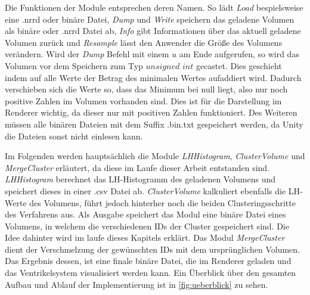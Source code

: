Die Funktionen der Module entsprechen deren Namen. So lädt \textit{Load} bespielsweise eine .nrrd oder binäre Datei, \textit{Dump} und \textit{Write} speichern das geladene Volumen als binäre oder .nrrd Datei ab, \textit{Info} gibt Informationen über das aktuell geladene Volumen zurück und \textit{Resample} lässt den Anwender die Größe des Volumens verändern.
\newline
Wird der \textit{Dump} Befehl mit einem $u$ am Ende aufgerufen, so wird das Volumen vor dem Speichern zum Typ $unsigned$ $int$ gecastet. Dies geschieht indem auf alle Werte der Betrag des minimalen Wertes aufaddiert wird. Dadurch verschieben sich die Werte so, dass das Minimum bei null liegt, also nur noch positive Zahlen im Volumen vorhanden sind. Dies ist für die Darstellung im Renderer wichtig, da dieser nur mit positiven Zahlen funktioniert. Des Weiteren müssen alle binären Dateien mit dem Suffix .bin.txt gespeichert werden, da Unity die Dateien sonst nicht einlesen kann.


Im Folgenden werden hauptsächlich die Module \textit{LHHistogram}, \textit{ClusterVolume} und \textit{MergeCluster} erläutert, da diese im Laufe dieser Arbeit entstanden sind. \textit{LHHistogram} berechnet das LH-Histogramm des geladenen Volumens und speichert dieses in einer .csv Datei ab. \textit{ClusterVolume} kalkuliert ebenfalls die LH-Werte des Volumens, führt jedoch hinterher noch die beiden Clusteringsschritte des Verfahrens aus. Als Ausgabe speichert das Modul eine binäre Datei eines Volumens, in welchem die verschiedenen IDs der Cluster gespeichert sind. Die Idee dahinter wird im laufe dieses Kapitels erklärt. Das Modul \textit{MergeCluster} dient der Verschmelzung der gewünschten IDs mit dem ursprünglichen Volumen. Das Ergebnis dessen, ist eine finale binäre Datei, die im Renderer geladen und das Ventrikelsystem visualisiert werden kann. Ein Überblick über den gesamten Aufbau und Ablauf der Implementierung ist in  \autoref{fig:ueberblick} zu sehen.

